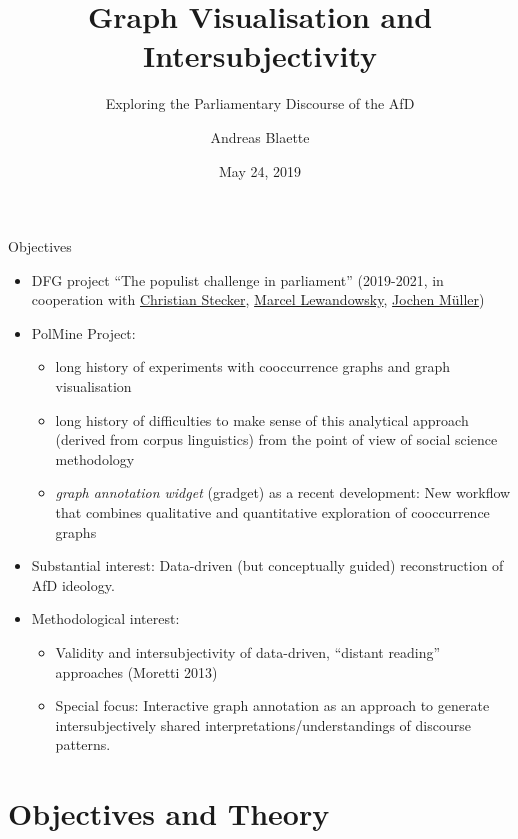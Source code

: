 \documentclass[
  ignorenonframetext,
]{beamer}
\title{Graph Visualisation and Intersubjectivity}
\subtitle{Exploring the Parliamentary Discourse of the AfD}
\author{Andreas Blaette}
\date{May 24, 2019}
\providecommand{\tightlist}{%
  \setlength{\itemsep}{0pt}\setlength{\parskip}{0pt}}
\begin{document}
\frame{\titlepage}

\begin{frame}{Objectives}
\protect\hypertarget{objectives}{}

\begin{itemize}
\item
  DFG project ``The populist challenge in parliament'' (2019-2021, in
  cooperation with
  \href{https://www.mzes.uni-mannheim.de/d7/de/profiles/christian-stecker}{Christian
  Stecker},
  \href{https://de.wikipedia.org/wiki/Marcel_Lewandowsky}{Marcel
  Lewandowsky},
  \href{https://ipk.uni-greifswald.de/politikwissenschaft/professor-dr-jochen-mueller/}{Jochen
  Müller})
\item
  PolMine Project:

  \begin{itemize}
  \tightlist
  \item
    long history of experiments with cooccurrence graphs and graph
    visualisation
  \item
    long history of difficulties to make sense of this analytical
    approach (derived from corpus linguistics) from the point of view of
    social science methodology
  \item
    \emph{graph annotation widget} (gradget) as a recent development:
    New workflow that combines qualitative and quantitative exploration
    of cooccurrence graphs
  \end{itemize}
\item
  Substantial interest: Data-driven (but conceptually guided)
  reconstruction of AfD ideology.
\item
  Methodological interest:

  \begin{itemize}
  \tightlist
  \item
    Validity and intersubjectivity of data-driven, ``distant reading''
    approaches (Moretti 2013)
  \item
    Special focus: Interactive graph annotation as an approach to
    generate intersubjectively shared interpretations/understandings of
    discourse patterns.
  \end{itemize}
\end{itemize}

\end{frame}

\hypertarget{objectives-and-theory}{%
\section{Objectives and Theory}\label{objectives-and-theory}}
\end{document}
